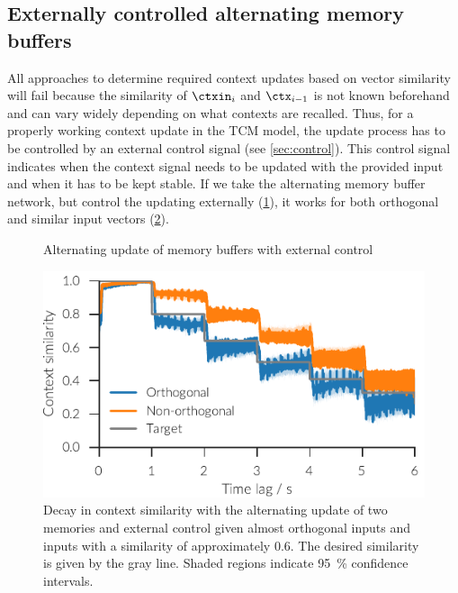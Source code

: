 \subsection{Externally controlled alternating memory buffers}
All approaches to determine required context updates based on vector similarity will fail because the similarity of $\ctxin_i$ and $\ctx_{i-1}$ is not known beforehand and can vary widely depending on what contexts are recalled.
Thus, for a properly working context update in the TCM model, the update process has to be controlled by an external control signal (see \cref{sec:control}).
This control signal indicates when the context signal needs to be updated with the provided input and when it has to be kept stable.
If we take the alternating memory buffer network, but control the updating externally (\cref{fig:ctx-ext-ctrl}), it works for both orthogonal and similar input vectors (\cref{fig:ext-amb}).
\begin{figure}
    \centering
    \caption{Alternating update of memory buffers with external control}\label{fig:ctx-ext-ctrl}
\end{figure}
\begin{figure}
    \centering
    \includegraphics{figures/context-analysis/ext-amb}
    \caption[Decay in context similarity with the alternating update of two memories and external control]{
        Decay in context similarity with the alternating update of two memories and external control given almost orthogonal inputs and inputs with a similarity of approximately \num{0.6}.
        The desired similarity is given by the gray line. Shaded regions indicate \SI{95}{\percent} confidence intervals.}\label{fig:ext-amb}
\end{figure}

